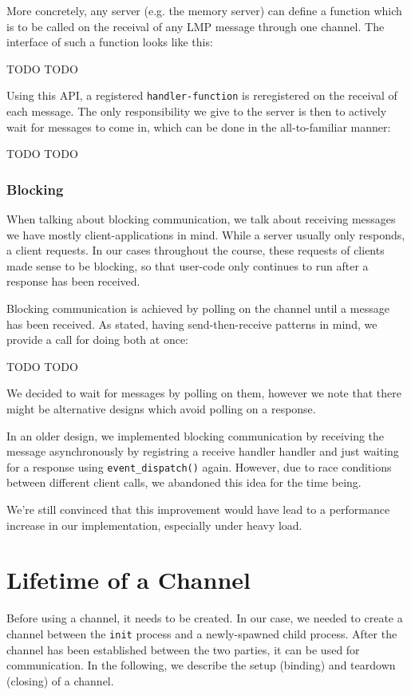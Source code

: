 More concretely, any server (e.g. the memory server) can define a function which is to be called
on the receival of any LMP message through one channel. The interface of such a function looks like this:

TODO TODO

Using this API, a registered \texttt{handler-function} is reregistered on the receival
of each message. The only responsibility we give to the server is then to actively wait for 
messages to come in, which can be done in the all-to-familiar manner:

TODO TODO

\subsubsection{Blocking}
When talking about blocking communication, we talk about receiving messages we have mostly 
client-applications in mind. While a server usually only responds, a client requests.
In our cases throughout the course, these requests of clients made sense to be blocking, 
so that user-code only continues to run after a response has been received.

Blocking communication is achieved by polling on the channel until a message has been received.
As stated, having send-then-receive patterns in mind, we provide a call for doing 
both at once:

TODO TODO

We decided to wait for messages by polling on them, however we note that there might be 
alternative designs which avoid polling on a response. 

In an older design, we implemented blocking communication by receiving the message asynchronously 
by registring a receive handler handler and just waiting for a response 
using \texttt{event\_dispatch()} again.
However, due to race conditions between different client calls, we abandoned this idea 
for the time being. 

We're still convinced that this improvement would have lead to a performance increase in 
our implementation, especially under heavy load.

\section{Lifetime of a Channel}
Before using a channel, it needs to be created. 
In our case, we needed to create a channel between the \texttt{init} process and a newly-spawned
child process. After the channel has been established between the two parties, 
it can be used for communication. In the following, we describe the setup (binding) 
and teardown (closing) of a channel.

